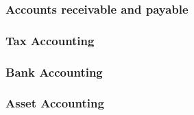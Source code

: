 \subsubsection{Accounts receivable and payable} %
\subsubsection{Tax Accounting} %

\subsubsection{Bank Accounting} %
\subsubsection{Asset Accounting} %


